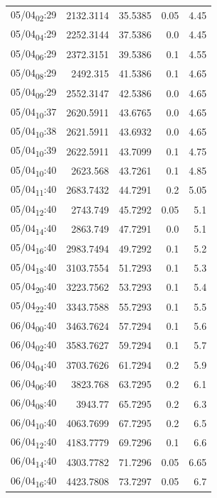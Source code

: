 \documentclass[11pt]{article}
\begin{document}
\begin{center}
\begin{tabular}{lrrrr}
05/04\textsubscript{02}:29 & 2132.3114 & 35.5385 & 0.05 & 4.45\\[0pt]
05/04\textsubscript{04}:29 & 2252.3144 & 37.5386 & 0.0 & 4.45\\[0pt]
05/04\textsubscript{06}:29 & 2372.3151 & 39.5386 & 0.1 & 4.55\\[0pt]
05/04\textsubscript{08}:29 & 2492.315 & 41.5386 & 0.1 & 4.65\\[0pt]
05/04\textsubscript{09}:29 & 2552.3147 & 42.5386 & 0.0 & 4.65\\[0pt]
05/04\textsubscript{10}:37 & 2620.5911 & 43.6765 & 0.0 & 4.65\\[0pt]
05/04\textsubscript{10}:38 & 2621.5911 & 43.6932 & 0.0 & 4.65\\[0pt]
05/04\textsubscript{10}:39 & 2622.5911 & 43.7099 & 0.1 & 4.75\\[0pt]
05/04\textsubscript{10}:40 & 2623.568 & 43.7261 & 0.1 & 4.85\\[0pt]
05/04\textsubscript{11}:40 & 2683.7432 & 44.7291 & 0.2 & 5.05\\[0pt]
05/04\textsubscript{12}:40 & 2743.749 & 45.7292 & 0.05 & 5.1\\[0pt]
05/04\textsubscript{14}:40 & 2863.749 & 47.7291 & 0.0 & 5.1\\[0pt]
05/04\textsubscript{16}:40 & 2983.7494 & 49.7292 & 0.1 & 5.2\\[0pt]
05/04\textsubscript{18}:40 & 3103.7554 & 51.7293 & 0.1 & 5.3\\[0pt]
05/04\textsubscript{20}:40 & 3223.7562 & 53.7293 & 0.1 & 5.4\\[0pt]
05/04\textsubscript{22}:40 & 3343.7588 & 55.7293 & 0.1 & 5.5\\[0pt]
06/04\textsubscript{00}:40 & 3463.7624 & 57.7294 & 0.1 & 5.6\\[0pt]
06/04\textsubscript{02}:40 & 3583.7627 & 59.7294 & 0.1 & 5.7\\[0pt]
06/04\textsubscript{04}:40 & 3703.7626 & 61.7294 & 0.2 & 5.9\\[0pt]
06/04\textsubscript{06}:40 & 3823.768 & 63.7295 & 0.2 & 6.1\\[0pt]
06/04\textsubscript{08}:40 & 3943.77 & 65.7295 & 0.2 & 6.3\\[0pt]
06/04\textsubscript{10}:40 & 4063.7699 & 67.7295 & 0.2 & 6.5\\[0pt]
06/04\textsubscript{12}:40 & 4183.7779 & 69.7296 & 0.1 & 6.6\\[0pt]
06/04\textsubscript{14}:40 & 4303.7782 & 71.7296 & 0.05 & 6.65\\[0pt]
06/04\textsubscript{16}:40 & 4423.7808 & 73.7297 & 0.05 & 6.7\\[0pt]

\end{tabular}
\end{center}
\end{document}
